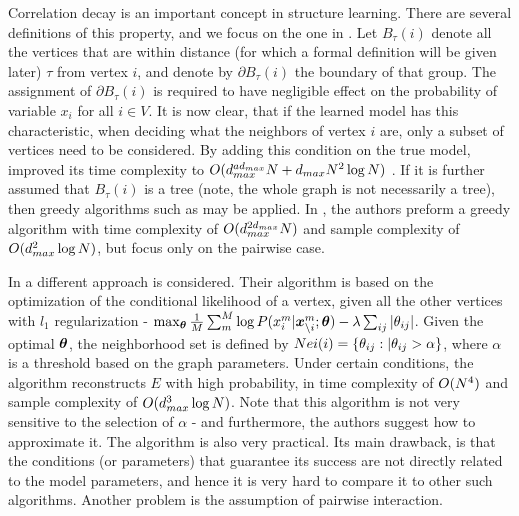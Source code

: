 Correlation decay is an important concept in structure learning.
There are several definitions of this property, and we focus on the one in \cite{montanari2009graphical}.
Let $B_{\tau}(i)$ denote all the vertices that are within distance (for which a formal definition will be given later) $\tau$ from vertex $i$, and denote by $\partial B_{\tau}(i)$ the boundary of that group.
The assignment of $\partial B_{\tau}(i)$ is required to have negligible effect on the probability of variable $x_i$ for all $i \in V$.
It is now clear, that if the learned model has this characteristic, when deciding what the neighbors of vertex $i$ are, only a subset of vertices need to be considered.
By adding this condition on the true model, \cite{bresler2008reconstruction} improved its time complexity to $O(d_{max}^{ad_{max}}N+d_{max}N^2\log N)$ .
If it is further assumed that $B_{\tau}(i)$ is a tree (note, the whole graph is not necessarily a tree), then greedy algorithms such as \cite{netrapalli2010greedy, anandkumar2013learning} may be applied.
In \cite{anandkumar2013learning}, the authors preform a greedy algorithm with time complexity of $O(d_{max}^{2d_{max}}{N})$ and sample complexity of $O(d_{max}^2\log N)$, but focus only on the pairwise case.  

In \cite{ravikumar2010high} a different approach is considered. Their algorithm is based on the optimization of the conditional likelihood of a vertex, given all the other vertices with $l_1$ regularization - $\max_{\boldsymbol{\theta}} \frac{1}{M}\sum_m^{M} \log P(x^{m}_i| \boldsymbol{x}^m_{\setminus i};\boldsymbol{\theta}) - \lambda \sum_{ij} |\theta_{ij}|$.
Given the optimal $\boldsymbol{\theta}$, the neighborhood set is defined by $Nei(i) = \{\theta_{ij} : |\theta_{ij} > \alpha\}$, where $\alpha$ is a threshold based on the graph parameters.
Under certain conditions, the algorithm reconstructs $E$ with high probability, in time complexity of $O({N}^4)$ and sample complexity of $O( d_{max}^3 \log {N})$.
Note that this algorithm is not very sensitive to the selection of $\alpha$ - and furthermore, the authors suggest how to approximate it.
The algorithm is also very practical.
Its main drawback, is that the conditions (or parameters) that guarantee its success are not directly related to the model parameters, and hence it is very hard to compare it to other such algorithms. Another problem is the assumption of pairwise interaction.     

